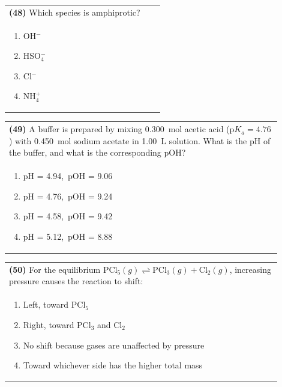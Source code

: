 \documentclass{article}
\begin{document}
\noindent\begin{tabular}{|p{0.9\linewidth}|}
\hline
\textbf{(48)} Which species is amphiprotic? \\[0.2cm]
\begin{minipage}{0.85\linewidth}
\begin{enumerate}[label=\alph*.]
\item OH$^-$ \item HSO$_4^-$ \item Cl$^-$ \item NH$_4^+$
\end{enumerate}
\end{minipage}\\[0.2cm]
\hline
\end{tabular}

\noindent\begin{tabular}{|p{0.9\linewidth}|}
\hline
\textbf{(49)} A buffer is prepared by mixing 0.300~mol acetic acid (p$K_a=4.76$) with 0.450~mol sodium acetate in 1.00~L solution. What is the pH of the buffer, and what is the corresponding pOH?\\[0.2cm]
\begin{minipage}[t]{0.85\linewidth}
\begin{enumerate}[label=\alph*.]
\item pH = 4.94,\ pOH = 9.06
\item pH = 4.76,\ pOH = 9.24
\item pH = 4.58,\ pOH = 9.42
\item pH = 5.12,\ pOH = 8.88
\end{enumerate}
\end{minipage}\\[0.2cm]
\hline
\end{tabular}

\noindent\begin{tabular}{|p{0.9\linewidth}|}
\hline
\textbf{(50)} For the equilibrium $ \text{PCl}_5(g) \rightleftharpoons \text{PCl}_3(g) + \text{Cl}_2(g)$, increasing pressure causes the reaction to shift: \\[0.2cm]
\begin{minipage}[t]{0.85\linewidth}
\begin{enumerate}[label=\alph*.]
\item Left, toward PCl$_5$
\item Right, toward PCl$_3$ and Cl$_2$
\item No shift because gases are unaffected by pressure
\item Toward whichever side has the higher total mass
\end{enumerate}
\end{minipage}\\[0.2cm]
\hline
\end{tabular}
\end{document}
